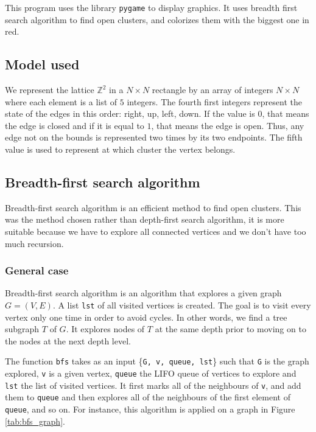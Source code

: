 \documentclass[a4paper,11pt]{article}
\theoremstyle{plain}
\theoremstyle{definition}
\theoremstyle{remark}
\begin{document}
This program uses the library \lstinline[language=Python]{pygame} to display graphics. It uses breadth first search algorithm to find open clusters, and colorizes them with the biggest one in red.

\subsection{Model used}
We represent the lattice $\mathbb{Z}^2$ in a $N \times N$ rectangle by an array of integers $N \times N$ where each element is a list of $5$ integers. The fourth first integers represent the state of the edges in this order: right, up, left, down. If the value is $0$, that means the edge is closed and if it is equal to $1$, that means the edge is open. Thus, any edge not on the bounds is represented two times by its two endpoints. The fifth value is used to represent at which cluster the vertex belongs.

\subsection{Breadth-first search algorithm}
Breadth-first search algorithm is an efficient method to find open clusters. This was the method chosen rather than depth-first search algorithm, it is more suitable because we have to explore all connected vertices and we don't have too much recursion.

\subsubsection{General case}
Breadth-first search algorithm is an algorithm that explores a given graph $G = (V,E)$. A list \lstinline[language=Python]{lst} of all visited vertices is created. The goal is to visit every vertex only one time in order to avoid cycles. In other words, we find a tree subgraph $T$ of $G$. It explores nodes of $T$ at the same depth prior to moving on to the nodes at the next depth level.

The function \lstinline[language=Python]{bfs} takes as an input \{\lstinline[language=Python]{G, v, queue, lst}\} such that \lstinline[language=Python]{G} is the graph explored, \lstinline[language=Python]{v} is a given vertex, \lstinline[language=Python]{queue} the LIFO queue of vertices to explore and  \lstinline[language=Python]{lst} the list of visited vertices. It first marks all of the neighbours of  \lstinline[language=Python]{v}, and add them to  \lstinline[language=Python]{queue} and then explores all of the neighbours of the first element of \lstinline[language=Python]{queue}, and so on. For instance, this algorithm is applied on a graph in Figure \ref{tab:bfs_graph}.
\end{document}
